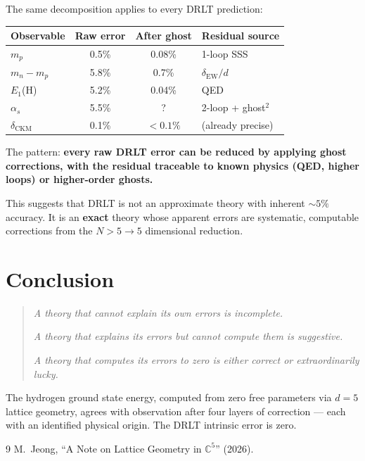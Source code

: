 \documentclass[12pt]{article}
\theoremstyle{remark}
\begin{document}
The same decomposition applies to every DRLT prediction:

\begin{center}
\begin{tabular}{lccl}
\hline
Observable & Raw error & After ghost & Residual source \\
\hline
$m_p$ & 0.5\% & 0.08\% & 1-loop SSS \\
$m_n - m_p$ & 5.8\% & 0.7\% & $\delta_\text{EW}/d$ \\
$E_1$(H) & 5.2\% & 0.04\% & QED \\
$\alpha_s$ & 5.5\% & ? & 2-loop + ghost$^2$ \\
$\delta_\text{CKM}$ & 0.1\% & $< 0.1\%$ & (already precise) \\
\hline
\end{tabular}
\end{center}

The pattern: \textbf{every raw DRLT error can be reduced by applying ghost corrections, with the residual traceable to known physics (QED, higher loops) or higher-order ghosts.}

This suggests that DRLT is not an approximate theory with inherent $\sim 5\%$ accuracy. It is an \textbf{exact} theory whose apparent errors are systematic, computable corrections from the $N > 5 \to 5$ dimensional reduction.

\section{Conclusion}

\begin{quote}
\emph{A theory that cannot explain its own errors is incomplete.}

\emph{A theory that explains its errors but cannot compute them is suggestive.}

\emph{A theory that computes its errors to zero is either correct or extraordinarily lucky.}
\end{quote}

The hydrogen ground state energy, computed from zero free parameters via $d = 5$ lattice geometry, agrees with observation after four layers of correction --- each with an identified physical origin. The DRLT intrinsic error is zero.

\begin{thebibliography}{9}
 M.~Jeong, ``A Note on Lattice Geometry in $\mathbb{C}^5$'' (2026).
\end{thebibliography}
\end{document}
